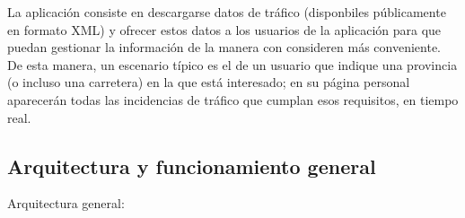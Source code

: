 La aplicación consiste en descargarse datos de tráfico (disponbiles públicamente en formato XML) y ofrecer estos datos a los usuarios de la aplicación para que puedan gestionar la información de la manera con consideren más conveniente. De esta manera, un escenario típico es el de un usuario que indique una provincia (o incluso una carretera) en la que está interesado; en su página personal aparecerán todas las incidencias de tráfico que cumplan esos requisitos, en tiempo real.

\subsection{Arquitectura y funcionamiento general}

Arquitectura general:

